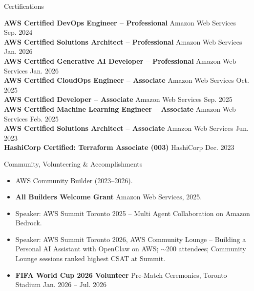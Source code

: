 \documentclass{resume}
\begin{document}
\begin{rSection}{Certifications}

\textbf{AWS Certified DevOps Engineer -- Professional} \textbar{} Amazon Web Services \hfill Sep. 2024 \\
\textbf{AWS Certified Solutions Architect -- Professional} \textbar{} Amazon Web Services \hfill Jan. 2026 \\
\textbf{AWS Certified Generative AI Developer -- Professional} \textbar{} Amazon Web Services \hfill Jan. 2026 \\
\textbf{AWS Certified CloudOps Engineer -- Associate} \textbar{} Amazon Web Services \hfill Oct. 2025 \\
\textbf{AWS Certified Developer -- Associate} \textbar{} Amazon Web Services \hfill Sep. 2025 \\
\textbf{AWS Certified Machine Learning Engineer -- Associate} \textbar{} Amazon Web Services \hfill Feb. 2025 \\
\textbf{AWS Certified Solutions Architect -- Associate} \textbar{} Amazon Web Services \hfill Jun. 2023 \\
\textbf{HashiCorp Certified: Terraform Associate (003)} \textbar{} HashiCorp \hfill Dec. 2023 \\

\end{rSection}


\begin{rSection}{Community, Volunteering \& Accomplishments}
\begin{itemize}
    \itemsep -3pt {}
    \item AWS Community Builder (2023--2026).
    \item \textbf{All Builders Welcome Grant} \textbar{} Amazon Web Services, 2025.
    \item Speaker: AWS Summit Toronto 2025 -- Multi Agent Collaboration on Amazon Bedrock.
    \item Speaker: AWS Summit Toronto 2026, AWS Community Lounge -- Building a Personal AI Assistant with OpenClaw on AWS; $\sim$200 attendees; Community Lounge sessions ranked highest CSAT at Summit.
    \item \textbf{FIFA World Cup 2026 Volunteer} \textbar{} Pre-Match Ceremonies, Toronto Stadium \hfill Jan. 2026 -- Jul. 2026
\end{itemize}
\end{rSection}
\end{document}
